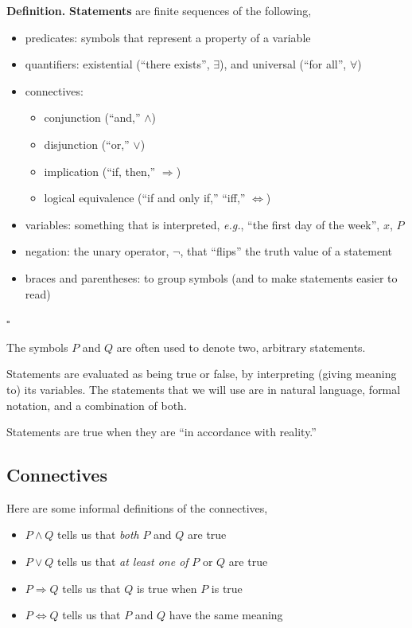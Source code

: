 \documentclass[letterpaper,twoside]{article}
\def\SmallHSpace{\hspace*{1mm}}
\newcommand{\Eg}[1]{\textit{e.g.}, #1}
\newcommand{\DefinedTerm}[1]{\textbf{#1}}
\newcommand{\Definition}[1]{%
    \emoji{book} \textbf{Definition.}\SmallHSpace #1 \hfill $\square$
}
\newenvironment{SorrellItemize}
{
    \setlength\parskip{-5pt}
    \begin{itemize}[leftmargin=11pt]
        \setlength\itemsep{-4pt}
}{
    \end{itemize}
}
\begin{document}
\begin{multicols}{2}
\Definition
{
    \DefinedTerm{Statements} are finite sequences of the following,
    \begin{SorrellItemize}
        \item predicates: symbols that represent a property of a variable
        \item quantifiers: existential (``there exists'', $\exists$), and universal (``for all'', $\forall$)
        \item connectives:
        \begin{SorrellItemize}
            \item conjunction (``and,'' $\land$)
            \item disjunction (``or,'' $\lor$)
            \item implication (``if, then,'' $\Longrightarrow$)
            \item logical equivalence (``if and only if,'' ``iff,'' $\Longleftrightarrow$)
        \end{SorrellItemize}
        \item variables: something that is interpreted, \Eg{``the first day of the week'', $x$, $P$}
        \item negation: the unary operator, $\lnot$, that ``flips'' the truth value of a statement
        \item braces and parentheses: to group symbols (and to make statements easier to read)
    \end{SorrellItemize}
}

The symbols $P$ and $Q$ are often used to denote two, arbitrary statements.

Statements are evaluated as being true or false, by interpreting (giving meaning to) its variables.
The statements that we will use are in natural language, formal notation, and a combination of both.

Statements are true when they are ``in accordance with reality.''

\subsection{Connectives}

Here are some informal definitions of the connectives,
\begin{SorrellItemize}
    \item $P\land Q$ tells us that \textit{both} $P$ and $Q$ are true
    \item $P\lor Q$ tells us that \textit{at least one of} $P$ or $Q$ are true
    \item $P\Longrightarrow Q$ tells us that $Q$ is true when $P$ is true
    \item $P\Longleftrightarrow Q$ tells us that $P$ and $Q$ have the same meaning
\end{SorrellItemize}


\end{multicols}
\end{document}
